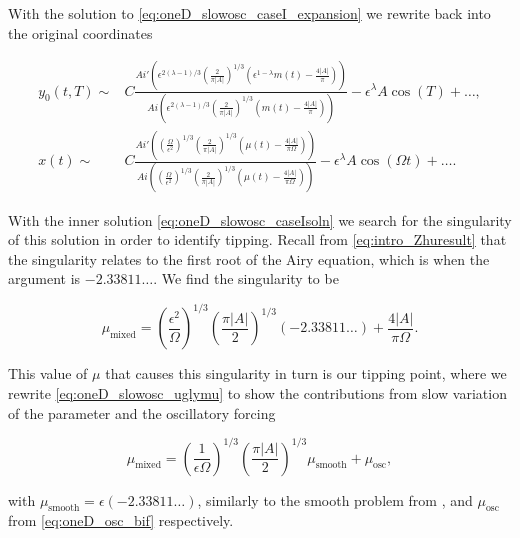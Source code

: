 With the solution to \eqref{eq:oneD_slowosc_caseI_expansion} we rewrite back into the original coordinates

\begin{equation}\label{eq:oneD_slowosc_caseIsoln}
\begin{aligned}
y_0(t,T)\sim& C\frac{Ai'\left(\epsilon^{2(\lambda-1)/3}\left(\frac{2}{\pi |A|}\right)^{1/3}(\epsilon^{1-\lambda}m(t)-\frac{4|A|}{\pi})\right)}{Ai\left(\epsilon^{2(\lambda-1)/3}\left(\frac{2}{\pi |A|}\right)^{1/3}(m(t)-\frac{4|A|}{\pi})\right)}-\epsilon^\lambda A\cos(T)+\ldots,\\
x(t) \sim& C\frac{Ai'\left(\left(\frac{\Omega}{\epsilon^2}\right)^{1/3}\left(\frac{2}{\pi |A|}\right)^{1/3}(\mu(t)-\frac{4|A|}{\pi \Omega})\right)}{Ai\left(\left(\frac{\Omega}{\epsilon^2}\right)^{1/3}\left(\frac{2}{\pi |A|}\right)^{1/3}(\mu(t)-\frac{4|A|}{\pi \Omega})\right)}-\epsilon^\lambda A\cos(\Omega t) +\ldots.
\end{aligned}
\end{equation}

With the inner solution \eqref{eq:oneD_slowosc_caseIsoln} we search for the singularity of this solution in order to identify tipping. Recall from \eqref{eq:intro_Zhuresult} that the singularity relates to the first root of the Airy equation, which is when the argument is $-2.33811\ldots$. We find the singularity to be

\begin{equation}\label{eq:oneD_slowosc_uglymu}
\mu_{\text{mixed}}=\left(\frac{\epsilon^2}{\Omega}\right)^{1/3}\left(\frac{\pi |A|}{2}\right)^{1/3}(-2.33811\ldots)+\frac{4|A|}{\pi \Omega}.
\end{equation}

This value of $\mu$ that causes this singularity in turn is our tipping point, where we rewrite \eqref{eq:oneD_slowosc_uglymu} to show the contributions from slow variation of the parameter and the oscillatory forcing

\begin{equation}\label{eq:oneD_slowosc_caseItipping}
\mu_{\text{mixed}} = \left(\frac{1}{\epsilon\Omega}\right)^{1/3}\left(\frac{\pi |A|}{2}\right)^{1/3} \mu_{\text{smooth}}+\mu_{\text{osc}},
\end{equation}

with $\mu_{\text{smooth}}=\epsilon\left(-2.33811\ldots\right)$, similarly to the smooth problem from \cite{zhu2015tipping}, and $\mu_{\text{osc}}$ from \eqref{eq:oneD_osc_bif} respectively.

